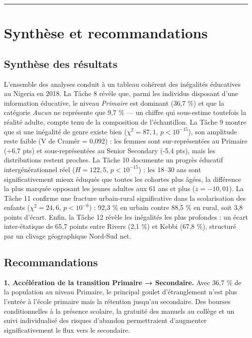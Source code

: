 \documentclass[
]{article}
\begin{document}
\begin{center}\rule{0.5\linewidth}{0.5pt}\end{center}

\section{Synthèse et
recommandations}\label{synthuxe8se-et-recommandations}

\subsection{Synthèse des résultats}\label{synthuxe8se-des-ruxe9sultats}

L'ensemble des analyses conduit à un tableau cohérent des inégalités
éducatives au Nigeria en 2018. La Tâche 8 révèle que, parmi les
individus disposant d'une information éducative, le niveau
\emph{Primaire} est dominant (36,7 \%) et que la catégorie \emph{Aucun}
ne représente que 9,7 \% --- un chiffre qui sous-estime toutefois la
réalité adulte, compte tenu de la composition de l'échantillon. La Tâche
9 montre que si une inégalité de genre existe bien (\(\chi^2 = 87{,}1\),
\(p < 10^{-15}\)), son amplitude reste faible (V de Cramér = 0,092) :
les femmes sont sur-représentées au Primaire (+6,7 pts) et
sous-représentées au Senior Secondary (-5,4 pts), mais les distributions
restent proches. La Tâche 10 documente un progrès éducatif
intergénérationnel réel (\(H = 122{,}5\), \(p < 10^{-15}\)) : les 18--30
ans sont significativement mieux éduqués que toutes les cohortes plus
âgées, la différence la plus marquée opposant les jeunes adultes aux 61
ans et plus (\(z = -10{,}01\)). La Tâche 11 confirme une fracture
urbain-rural significative dans la scolarisation des enfants
(\(\chi^2 = 24{,}6\), \(p < 10^{-6}\)) : 92,3 \% en urbain contre 88,5
\% en rural, soit 3,8 points d'écart. Enfin, la Tâche 12 révèle les
inégalités les plus profondes : un écart inter-étatique de 65,7 points
entre Rivers (2,1 \%) et Kebbi (67,8 \%), structuré par un clivage
géographique Nord-Sud net.

\subsection{Recommandations}\label{recommandations}

\textbf{1. Accélération de la transition Primaire → Secondaire.} Avec
36,7 \% de la population au niveau Primaire, le principal goulet
d'étranglement n'est plus l'entrée à l'école primaire mais la rétention
jusqu'au secondaire. Des bourses conditionnelles à la présence scolaire,
la gratuité des manuels au collège et un suivi individualisé des risques
d'abandon permettraient d'augmenter significativement le flux vers le
secondaire.
\end{document}
